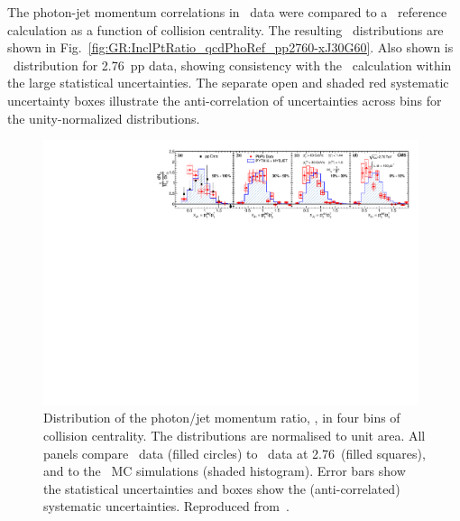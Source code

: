 The photon-jet momentum correlations in \PbPb\ data were compared to a \PYTHYD\ reference
calculation as a function of collision centrality. The resulting
\xjg\ distributions are shown in Fig.~\ref{fig:GR:InclPtRatio_qcdPhoRef_pp2760-xJ30G60}.
Also shown is \avexjg\ distribution for 2.76\TeV\ pp data, showing consistency
with the \PYTHYD\ calculation within the large statistical uncertainties.
The separate open and shaded red systematic uncertainty boxes illustrate the
anti-correlation of uncertainties across bins for the unity-normalized distributions.

\begin{figure}[!ht]
\begin{center}
\includegraphics[width=0.98\textwidth]{jetfigures/Photonv7_Paper_InclPtRatio_all_cent4_G60J30_subDPhi1SS1_Isol0_Norm1log1.pdf}
\caption[]{\label{fig:GR:InclPtRatio_qcdPhoRef_pp2760-xJ30G60} Distribution of the photon/jet 
momentum ratio, \xjg, in four bins of collision centrality. 
  The distributions are normalised to unit area. All panels compare
\PbPb\ data (filled circles) to \pp\ data at
  2.76\TeV\ (filled squares), and to the \PYTHYD\ MC simulations
  (shaded histogram). Error bars show the statistical uncertainties and
boxes show the (anti-correlated) systematic uncertainties. Reproduced from~\cite{Chatrchyan:2012gt}.}
\label{fig:GR:CMS_xjg}
\end{center}
\end{figure}

